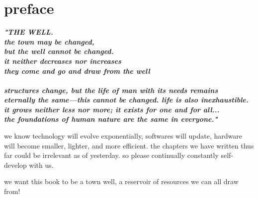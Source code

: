 
\SkipTocEntry\chapter*{preface}
\addtocounter{section}{1}
\begin{fullwidth}

{\itshape\bfseries "THE WELL.
\\
the town may be changed,
\\
but the well cannot be changed.
\\
it neither decreases nor increases
\\
they come and go and draw from the well
\\
\\
structures change, but the life of man with its needs remains
\\
eternally the same—this cannot be changed. life is also inexhaustible. 
\\
it grows neither less nor more; it exists for one and for all...
\\
the foundations of human nature are the same in everyone."

}

we know technology will evolve exponentially, softwares will update, hardware will become smaller, lighter, and more efficient. the chapters we have written thus far could be irrelevant as of yesterday. so please continually constantly self-develop with us. 

we want this book to be a town well, a reservoir of resources we can all draw from!

\clearpage
\end{fullwidth}
